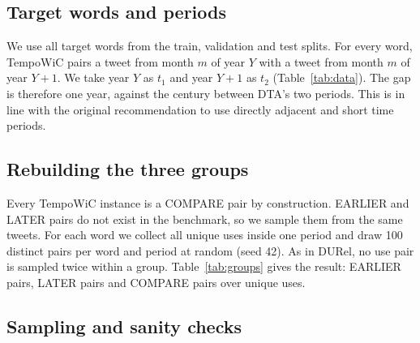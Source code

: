 \documentclass{article}
\begin{document}
\begin{table}[t]\centering\footnotesize
\caption{Alignment between \citet{schlechtweg2018durel} and this report. Rows
marked $\dagger$ are where the two studies differ by necessity rather than by
choice.}
\label{tab:alignment}

\end{table}

\subsection{Target words and periods}

We use all \numWords{} target words from the train, validation and test splits.
For every word, TempoWiC pairs a tweet from month $m$ of year $Y$ with a tweet
from month $m$ of year $Y{+}1$. We take year $Y$ as $t_1$ and year $Y{+}1$ as
$t_2$ (Table~\ref{tab:data}). The gap is therefore one year, against the century
between DTA's two periods. This is in line with the original recommendation to
use directly adjacent and short time periods.

\begin{table}[t]\centering\small
\caption{TempoWiC splits as used here. Only gold-labelled test instances are
kept; the dummy instances in the released test file are discarded.}
\label{tab:data}

\end{table}

\subsection{Rebuilding the three groups}
\label{sec:groups}

Every TempoWiC instance is a COMPARE pair by construction. EARLIER and LATER
pairs do not exist in the benchmark, so we sample them from the same tweets. For
each word we collect all unique uses inside one period and draw 100 distinct
pairs per word and period at random (seed 42). As in DURel, no use pair is
sampled twice within a group. Table~\ref{tab:groups} gives the result:
\numEarlier{} EARLIER pairs, \numLater{} LATER pairs and \numCompare{} COMPARE
pairs over \numUses{} unique uses.

\begin{table}[t]\centering\small
\caption{Use pairs per DURel group.}
\label{tab:groups}

\end{table}

\subsection{Sampling and sanity checks}
\end{document}
